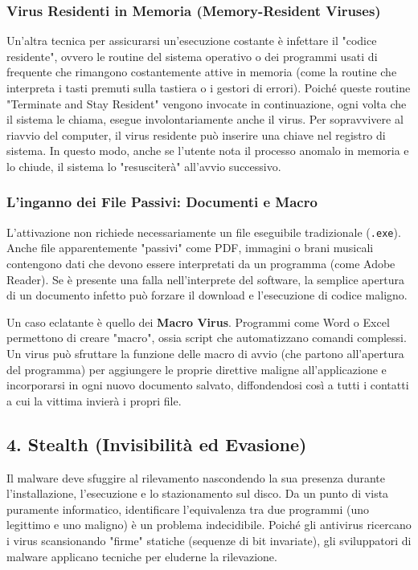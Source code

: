 \documentclass{article}
\begin{document}
\subsubsection*{Virus Residenti in Memoria (Memory-Resident Viruses)}

Un'altra tecnica per assicurarsi un'esecuzione costante è infettare il "codice residente", ovvero le routine del sistema operativo o dei programmi usati di frequente che rimangono costantemente attive in memoria (come la routine che interpreta i tasti premuti sulla tastiera o i gestori di errori). Poiché queste routine "Terminate and Stay Resident" vengono invocate in continuazione, ogni volta che il sistema le chiama, esegue involontariamente anche il virus. Per sopravvivere al riavvio del computer, il virus residente può inserire una chiave nel registro di sistema. In questo modo, anche se l'utente nota il processo anomalo in memoria e lo chiude, il sistema lo "resusciterà" all'avvio successivo.

\subsubsection*{L'inganno dei File Passivi: Documenti e Macro}

L'attivazione non richiede necessariamente un file eseguibile tradizionale (\texttt{.exe}). Anche file apparentemente "passivi" come PDF, immagini o brani musicali contengono dati che devono essere interpretati da un programma (come Adobe Reader). Se è presente una falla nell'interprete del software, la semplice apertura di un documento infetto può forzare il download e l'esecuzione di codice maligno.

Un caso eclatante è quello dei \textbf{Macro Virus}. Programmi come Word o Excel permettono di creare "macro", ossia script che automatizzano comandi complessi. Un virus può sfruttare la funzione delle macro di avvio (che partono all'apertura del programma) per aggiungere le proprie direttive maligne all'applicazione e incorporarsi in ogni nuovo documento salvato, diffondendosi così a tutti i contatti a cui la vittima invierà i propri file.

\vspace{0.8cm}

\subsection*{4. Stealth (Invisibilità ed Evasione)}

Il malware deve sfuggire al rilevamento nascondendo la sua presenza durante l'installazione, l'esecuzione e lo stazionamento sul disco. Da un punto di vista puramente informatico, identificare l'equivalenza tra due programmi (uno legittimo e uno maligno) è un problema indecidibile. Poiché gli antivirus ricercano i virus scansionando "firme" statiche (sequenze di bit invariate), gli sviluppatori di malware applicano tecniche per eluderne la rilevazione.
\end{document}
